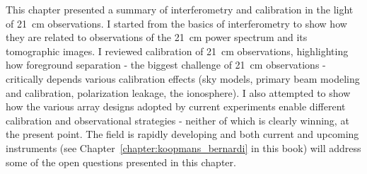 {This chapter presented a summary of interferometry and calibration in the light of 21~cm observations. I started from the basics of interferometry to show how they are related to observations of the 21~cm power spectrum and its tomographic images. I reviewed calibration of 21~cm observations, highlighting how foreground separation - the biggest challenge of 21~cm observations - critically depends various calibration effects (sky models, primary beam modeling and calibration, polarization leakage, the ionosphere). I also attempted to show how the various array designs adopted by current experiments enable different calibration and observational strategies - neither of which is clearly winning, at the present point. The field is rapidly developing and both current and upcoming instruments (see Chapter~\ref{chapter:koopmans_bernardi} in this book) will address some of the open questions presented in this chapter.






}
